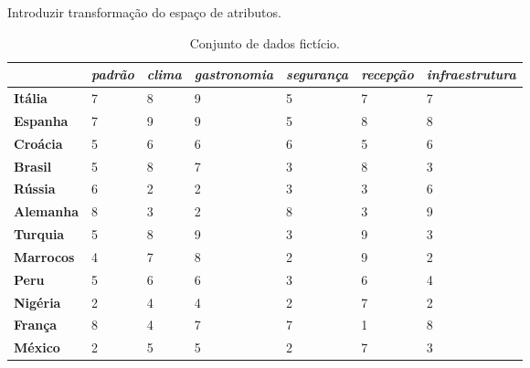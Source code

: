 


Introduzir transformação do espaço de atributos.


\begin{table}[htbp]
    \caption{Conjunto de dados fictício.}
    \begin{center}
        \begin{tabular}{|l|C{1.5cm}|C{1.5cm}|C{1.5cm}|C{1.5cm}|C{1.5cm}|C{1.5cm}|}
             & 
            \textbf{\textit{padrão}} & 
            \textbf{\textit{clima}} & 
            \textbf{\textit{gastronomia}} & 
            \textbf{\textit{segurança}} & 
            \textbf{\textit{recepção}} & 
            \textbf{\textit{infraestrutura}} \\ \hline
            \textbf{Itália} & 7 & 8 & 9 & 5 & 7 & 7 \\ \hline
            \textbf{Espanha} & 7 & 9 & 9 & 5 & 8 & 8 \\ \hline
            \textbf{Croácia} & 5 & 6 & 6 & 6 & 5 & 6 \\ \hline
            \textbf{Brasil} & 5 & 8 & 7 & 3 & 8 & 3 \\ \hline
            \textbf{Rússia} & 6 & 2 & 2 & 3 & 3 & 6 \\ \hline
            \textbf{Alemanha} & 8 & 3 & 2 & 8 & 3 & 9 \\ \hline
            \textbf{Turquia} & 5 & 8 & 9 & 3 & 9 & 3 \\ \hline
            \textbf{Marrocos} & 4 & 7 & 8 & 2 & 9 & 2 \\ \hline
            \textbf{Peru} & 5 & 6 & 6 & 3 & 6 & 4 \\ \hline
            \textbf{Nigéria} & 2 & 4 & 4 & 2 & 7 & 2 \\ \hline
            \textbf{França} & 8 & 4 & 7 & 7 & 1 & 8 \\ \hline
            \textbf{México} & 2 & 5 & 5 & 2 & 7 & 3 \\ \hline
        \end{tabular}
    \end{center}
    \label{tab:at}
\end{table}

